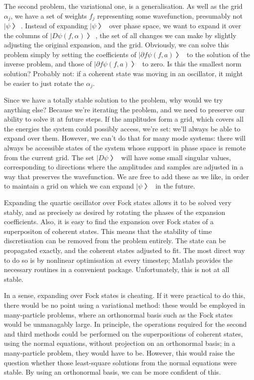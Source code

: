 The second problem, the variational one, is a generalisation.  As well as the grid $α_j$, we have a set of weights $f_j$ representing some wavefunction, presumably not $|ψ〉$.  Instead of expanding $|ψ〉$ over phase space, we want to expand it over the columns of $|Dψ(f,α)〉$, the set of all changes we can make by slightly adjusting the original expansion, and the grid.  Obviously, we can solve this problem simply by setting the coefficients of $|∂fψ(f,a)〉$ to the solution of the inverse problem, and those of $|∂fψ(f,a)〉$ to zero.  Is this the smallest norm solution?  Probably not: if a coherent state was moving in an oscillator, it might be easier to just rotate the $α_j$.

Since we have a totally stable solution to the problem, why would we try anything else?  Because we're iterating the problem, and we need to preserve our ability to solve it at future steps.  If the amplitudes form a grid, which covers all the energies the system could possibly access, we're set: we'll always be able to expand over them.  However, we can't do that for many mode systems: there will always be accessible states of the system whose support in phase space is remote from the current grid.  The set $|Dψ〉$ will have some small singular values, corresponding to directions where the amplitudes and samples are adjusted in a way that preserves the wavefunction.  We are free to add these as we like, in order to maintain a grid on which we can expand $|ψ〉$ in the future.


Expanding the quartic oscillator over Fock states allows it to be solved very stably, and as precisely as desired by rotating the phases of the expansion coefficients.  Also, it is easy to find the expansion over Fock states of a superpositon of coherent states.  This means that the stability of time discretisation can be removed from the problem entirely.  The state can be propagated exactly, and the coherent states adjusted to fit.  The most direct way to do so is by nonlinear optimisation at every timestep; Matlab provides the necessary routines in a convenient package.  Unfortunately, this is not at all stable.  

In a sense, expanding over Fock states is cheating.  If it were practical to do this, there would be no point using a variational method: these would be employed in many-particle problems, where an orthonormal basis such as the Fock states would be unmanagably large.  In principle, the operations required for the second and third methods could be performed on the superpositions of coherent states, using the normal equations, without projection on an orthonormal basis; in a many-particle problem, they would have to be.  However, this would raise the question whether those least-square solutions from the normal equations were stable.  By using an orthonormal basis, we can be more confident of this.

